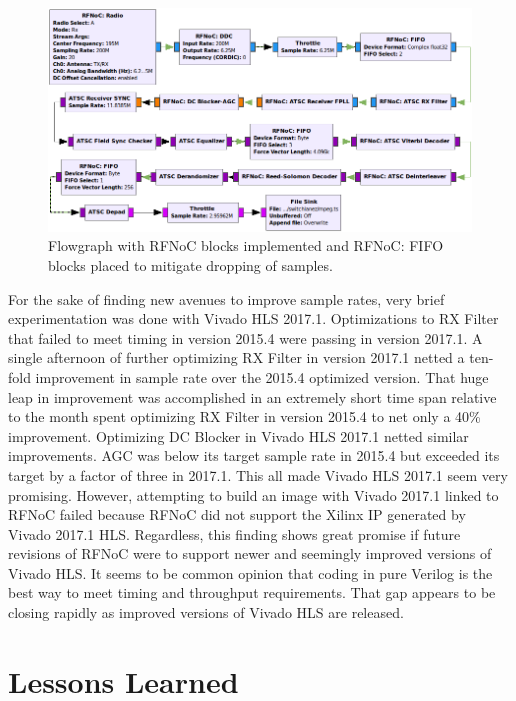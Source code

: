 \documentclass{article}
\begin{document}
\begin{figure}[h]
  \begin{center}
    \centerline{\includegraphics[width=\columnwidth]{grc.png}}
    \caption{Flowgraph with RFNoC blocks implemented and RFNoC: FIFO blocks placed to mitigate dropping of samples.}
    \label{grc}
  \end{center}
\end{figure}

For the sake of finding new avenues to improve sample rates, very brief experimentation was done with Vivado HLS 2017.1. Optimizations to RX Filter that failed to meet timing in version 2015.4 were passing in version 2017.1. A single afternoon of further optimizing RX Filter in version 2017.1 netted a ten-fold improvement in sample rate over the 2015.4 optimized version. That huge leap in improvement was accomplished in an extremely short time span relative to the month spent optimizing RX Filter in version 2015.4 to net only a 40\% improvement. Optimizing DC Blocker in Vivado HLS 2017.1 netted similar improvements. AGC was below its target sample rate in 2015.4 but exceeded its target by a factor of three in 2017.1. This all made Vivado HLS 2017.1 seem very promising. However, attempting to build an image with Vivado 2017.1 linked to RFNoC failed because RFNoC did not support the Xilinx IP generated by Vivado 2017.1 HLS. Regardless, this finding shows great promise if future revisions of RFNoC were to support newer and seemingly improved versions of Vivado HLS. It seems to be common opinion that coding in pure Verilog is the best way to meet timing and throughput requirements. That gap appears to be closing rapidly as improved versions of Vivado HLS are released.

\section{Lessons Learned} \label{lessonslearned}
\end{document}
